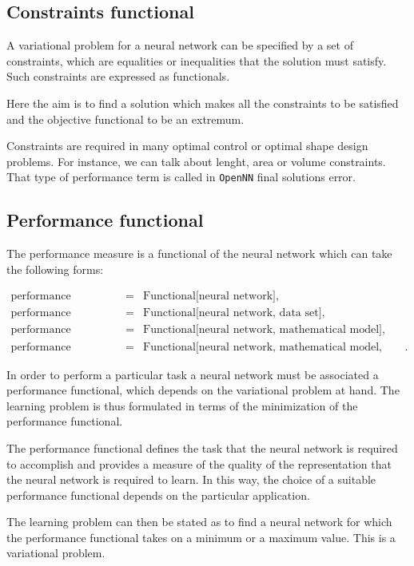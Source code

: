 \subsection*{Constraints functional}

A variational problem for a neural network can be
specified by a set of constraints, which are equalities or
inequalities that the solution must
satisfy. Such constraints are expressed as
functionals. 

Here the aim is to find a solution which makes all the constraints to be satisfied and the objective functional to be an extremum.

Constraints are required in many optimal control or optimal shape design problems. 
For instance, we can talk about lenght, area or volume constraints.
That type of performance term is called in \texttt{OpenNN} final solutions error.

\subsection*{Performance functional}

The performance measure is a functional of the neural network which can take the following forms:

\begin{eqnarray}\nonumber
\text{performance functional} &=& \text{Functional[neural network]},\\\nonumber
\text{performance functional} &=& \text{Functional[neural network, data set]},\\\nonumber
\text{performance functional} &=& \text{Functional[neural network, mathematical model]},\\\nonumber 
\text{performance functional} &=& \text{Functional[neural network, mathematical model, data set]}.
\end{eqnarray}


In order to perform a particular task a neural network must
be associated a performance functional, which depends on the variational
problem at hand. The learning problem 
is thus formulated in terms of the minimization of the performance
functional.

The performance functional defines the task that the neural
network is required to accomplish and provides a measure of the
quality of the representation that the neural network is required to
learn. In this way, the choice of a suitable performance functional
depends on the particular application.

The learning problem can then be stated as to find a neural network for which the performance functional 
takes on a minimum or a maximum value. This is a variational problem. 

